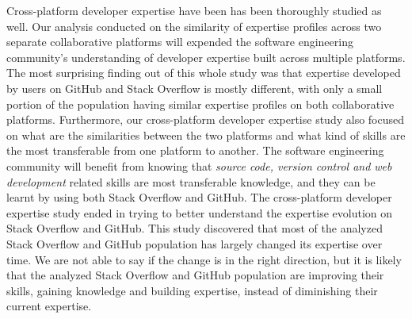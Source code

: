         Cross-platform developer expertise have been has been thoroughly studied as well. Our analysis conducted on the similarity of expertise profiles across two separate collaborative platforms will expended the software engineering community's understanding of developer expertise built across multiple platforms. The most surprising finding out of this whole study was that expertise developed by users on GitHub and Stack Overflow is mostly different, with only a small portion of the population having similar expertise profiles on both collaborative platforms. Furthermore, our cross-platform developer expertise study also focused on what are the similarities between the two platforms and what kind of skills are the most transferable from one platform to another. The software engineering community will benefit from knowing that \emph{source code, version control and web development} related skills are most transferable knowledge, and they can be learnt by using both Stack Overflow and GitHub. The cross-platform developer expertise study ended in trying to better understand the expertise evolution on Stack Overflow and GitHub. This study discovered that most of the analyzed Stack Overflow and GitHub population has largely changed its expertise over time. We are not able to say if the change is in the right direction, but it is likely that the analyzed Stack Overflow and GitHub population are improving their skills, gaining knowledge and building expertise, instead of diminishing their current expertise.
        

